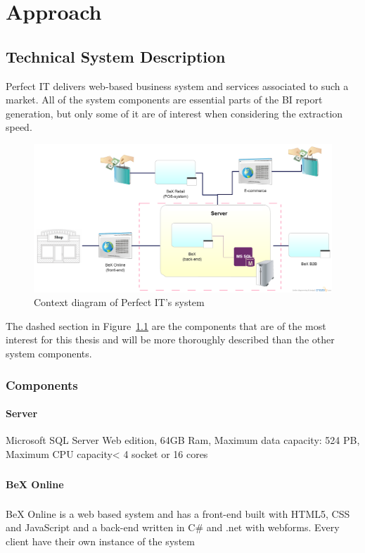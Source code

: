 \documentclass{cslthse-msc}
\newcommand{\bex}{BeX\textsuperscript{\textregistered} }
\begin{document}
\chapter{Approach}

\section{Technical System Description}
Perfect IT delivers web-based business system and services associated to such a market. All of the system components are essential parts of the BI report generation, but only some of it are of interest when considering the extraction speed.
\begin{figure}[H]
\vspace{-15pt}
  \begin{center}
    \includegraphics[scale=0.3]{Systemdesc.png}
  \end{center}
  \caption{Context diagram of Perfect IT's system}
  \label{context}
  \vspace{-15pt}
\end{figure}
\noindent The dashed section in Figure~\ref{context} are the components that are of the most interest for this thesis and will be more thoroughly described than the other system components.

\subsection{Components}


\subsubsection{Server}
Microsoft SQL Server Web edition, 64GB Ram, Maximum data capacity: 524 PB, Maximum CPU capacity< 4 socket or 16 cores 

\subsubsection{\bex Online}
\bex Online is a web based system and has a front-end built with HTML5, CSS and JavaScript and a back-end written in C\# and .net with webforms.
Every client have their own instance of the system 
\end{document}
